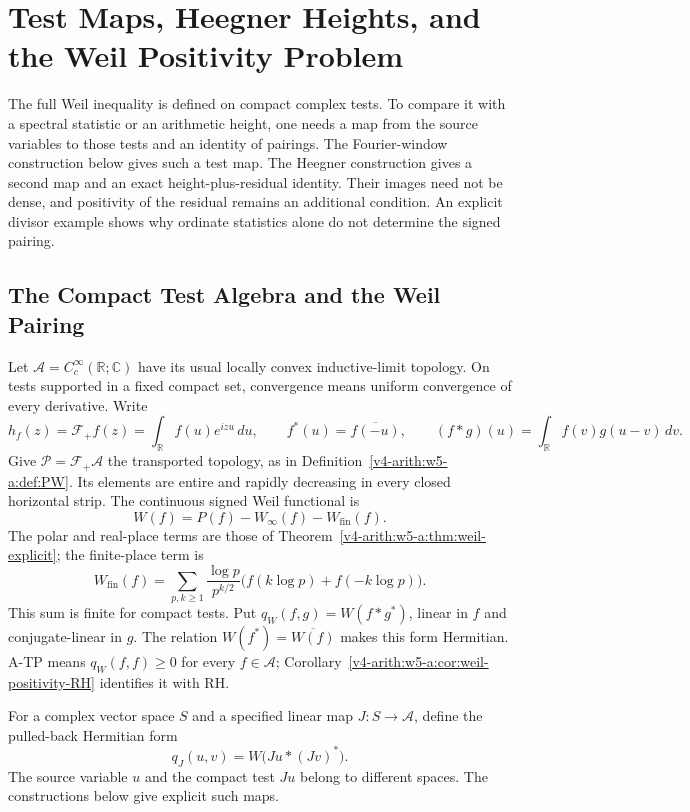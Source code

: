 \chapter{Test Maps, Heegner Heights, and the Weil Positivity Problem}
\label{v4-arith:w8-atp:chapter}

The full Weil inequality is defined on compact complex tests.
To compare it with a spectral statistic or an arithmetic height,
one needs a map from the source variables to those tests and
an identity of pairings. The Fourier-window construction below
gives such a test map. The Heegner construction gives a second
map and an exact height-plus-residual identity. Their images
need not be dense, and positivity of the residual remains an
additional condition. An explicit divisor example shows why
ordinate statistics alone do not determine the signed pairing.

\section{The Compact Test Algebra and the Weil Pairing}
\label{v4-arith:w8-atp:target}

Let $\mathscr A=C_c^\infty(\mathbb R;\mathbb C)$ have its usual
locally convex inductive-limit topology. On tests supported in a fixed
compact set, convergence means uniform convergence of every derivative.
Write
\[
 h_f(z)=\mathcal F_+f(z)=\int_{\mathbb R}f(u)e^{izu}\,du,
 \qquad f^*(u)=\overline{f(-u)},\qquad
 (f*g)(u)=\int_{\mathbb R}f(v)g(u-v)\,dv.
\]
Give $\mathscr P=\mathcal F_+\mathscr A$ the transported topology,
as in Definition~\ref{v4-arith:w5-a:def:PW}. Its elements are entire
and rapidly decreasing in every closed horizontal strip. The continuous
signed Weil functional is
\begin{equation}
\label{v4-arith:w8-atp:eq:weil-W}
 W(f)=P(f)-W_\infty(f)-W_{\mathrm{fin}}(f).
\end{equation}
The polar and real-place terms are those of
Theorem~\ref{v4-arith:w5-a:thm:weil-explicit}; the finite-place term is
\[
 W_{\mathrm{fin}}(f)=\sum_{p,k\geq1}\frac{\log p}{p^{k/2}}
                 \bigl(f(k\log p)+f(-k\log p)\bigr).
\]
This sum is finite for compact tests. Put
$q_W(f,g)=W(f*g^*)$, linear in $f$ and conjugate-linear in $g$.
The relation $W(f^*)=\overline{W(f)}$ makes this form Hermitian.
A-TP means $q_W(f,f)\geq0$ for every $f\in\mathscr A$;
Corollary~\ref{v4-arith:w5-a:cor:weil-positivity-RH} identifies it with RH.

For a complex vector space $S$ and a specified linear map
$J:S\to\mathscr A$, define the pulled-back Hermitian form
\[
 q_J(u,v)=W\bigl(Ju*(Jv)^*\bigr).
\]
The source variable $u$ and the compact test $Ju$ belong to
different spaces. The constructions below give explicit such maps.

